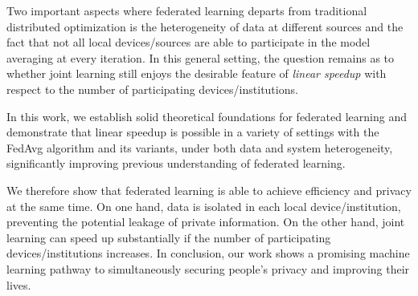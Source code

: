 Two important aspects where federated learning departs from traditional distributed optimization is the heterogeneity of data at different sources and the fact that not all local devices/sources are able to participate in the model averaging at every iteration. In this general setting, the question remains as to whether joint learning still enjoys the desirable feature of \emph{linear speedup} with respect to the number of participating devices/institutions.

In this work, we establish solid theoretical foundations for federated
learning and demonstrate that linear speedup is possible in a variety of settings with the FedAvg algorithm and its variants, under both data and system heterogeneity, significantly improving previous understanding of federated learning.

We therefore show that federated learning is able to achieve efficiency and privacy at the same time. On one hand, data is isolated in each local device/institution, preventing
the potential leakage of private information. On the other hand, joint learning can speed up substantially if the number of
participating devices/institutions increases. In conclusion, our work shows a promising machine learning pathway to simultaneously securing people's privacy and improving
their lives.



